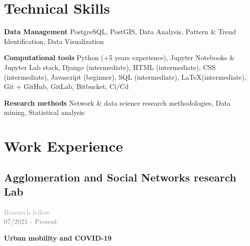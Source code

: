 \documentclass{academiccv}
\begin{document}
\section*{Technical Skills}
\begin{list}{}{}
	\item[\textbf{Data Management}] \tab PostgreSQL, PostGIS, Data Analysis, Pattern \& Trend Identification, Data Visualization 
	\item[\textbf{Computational tools}] \tab Python (+5 years experience), Jupyter Notebooks \& Jupyter Lab stack, Django (intermediate), HTML (intermediate), CSS (intermediate), Javascript (beginner), SQL (intermediate), \LaTeX (intermediate), Git + {GitHub, GitLab, Bitbucket}, Ci/Cd
	\item[\textbf{Research methods}] \tab Network \& data science research methodologies, Data mining, Statistical analysis
\end{list}

\section*{Work Experience}
\subsection*{Agglomeration and Social Networks research Lab}
\textcolor{darkgray}{{\large Research fellow}}\\
\textcolor{gray}{{\small 07/2021 - Present}}\\
\begin{list}{}{}
  \item{\textbf{Urban mobility and COVID-19}}
\end{list}
\vspace{0.5em}
\end{document}
